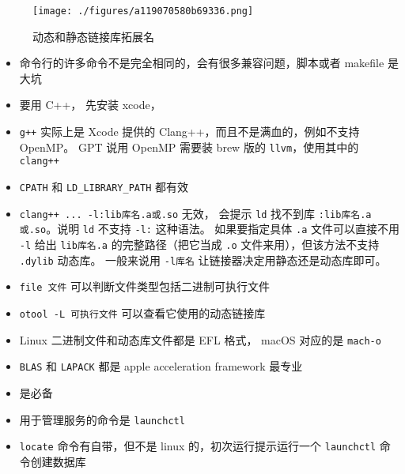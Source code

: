 
\begin{issues}
\issueDraft
\end{issues}

\begin{figure}[ht]
\centering
\texttt{[image: ./figures/a119070580b69336.png]}
\caption{动态和静态链接库拓展名} \label{fig_MacDev_1}
\end{figure}

\begin{itemize}
\item 命令行的许多命令不是完全相同的，会有很多兼容问题，脚本或者 makefile 是大坑
\item 要用 C++， 先安装 xcode， \item \verb`g++` 实际上是 Xcode 提供的 Clang++，而且不是满血的，例如不支持 OpenMP。 GPT 说用 OpenMP 需要装 brew 版的 \verb`llvm`，使用其中的 \verb`clang++`
\item \verb`CPATH` 和 \verb`LD_LIBRARY_PATH` 都有效
\item \verb`clang++ ... -l:lib库名.a或.so` 无效， 会提示 \verb`ld` 找不到库 \verb`:lib库名.a或.so`。说明 \verb`ld` 不支持 \verb`-l:` 这种语法。 如果要指定具体 \verb`.a` 文件可以直接不用 \verb`-l` 给出 \verb`lib库名.a` 的完整路径（把它当成 \verb`.o` 文件来用），但该方法不支持 \verb`.dylib` 动态库。 一般来说用 \verb`-l库名` 让链接器决定用静态还是动态库即可。
\item \verb`file 文件` 可以判断文件类型包括二进制可执行文件
\item \verb`otool -L 可执行文件` 可以查看它使用的动态链接库
\item Linux 二进制文件和动态库文件都是 EFL 格式， macOS 对应的是 \verb`mach-o`
\item \verb`BLAS` 和 \verb`LAPACK` 都是 apple acceleration framework 最专业
\item {} 是必备
\item 用于管理服务的命令是 \verb`launchctl`
\item \verb`locate` 命令有自带，但不是 linux 的，初次运行提示运行一个 \verb`launchctl` 命令创建数据库
\end{itemize}
